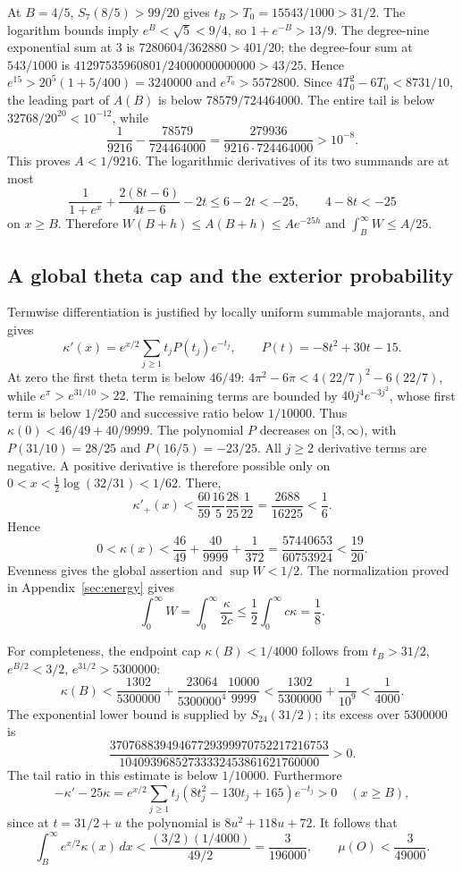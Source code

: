 At $B=4/5$, $S_7(8/5)>99/20$ gives
$t_B>T_0=15543/1000>31/2$.
The logarithm bounds imply $e^B<\sqrt5<9/4$, so $1+e^{-B}>13/9$.
The degree-nine exponential sum at $3$ is
$7280604/362880>401/20$; the degree-four sum at $543/1000$ is
$41297535960801/24000000000000>43/25$.
Hence $e^{15}>20^5(1+5/400)=3240000$ and $e^{T_0}>5572800$.
Since $4T_0^2-6T_0<8731/10$, the leading part of $A(B)$ is below
$78579/724464000$.
The entire tail is below $32768/20^{20}<10^{-12}$, while
\[
 \frac1{9216}-\frac{78579}{724464000}
 =\frac{279936}{9216\cdot724464000}>10^{-8}.
\]
This proves $A<1/9216$.
The logarithmic derivatives of its two summands are at most
\[
 \frac1{1+e^x}+\frac{2(8t-6)}{4t-6}-2t\le6-2t<-25,
 \qquad 4-8t<-25
\]
on $x\ge B$.
Therefore $W(B+h)\le A(B+h)\le Ae^{-25h}$ and
$\int_B^\infty W\le A/25$.

\subsection{A global theta cap and the exterior probability}
Termwise differentiation is justified by locally uniform summable majorants, and gives
\[
 \kappa'(x)=e^{x/2}\sum_{j\ge1}t_jP(t_j)e^{-t_j},
 \qquad P(t)=-8t^2+30t-15.
\]
At zero the first theta term is below $46/49$:
$4\pi^2-6\pi<4(22/7)^2-6(22/7)$, while
$e^\pi>e^{31/10}>22$.
The remaining terms are bounded by $40j^4e^{-3j^2}$,
whose first term is below $1/250$ and successive ratio below $1/10000$.
Thus $\kappa(0)<46/49+40/9999$.
The polynomial $P$ decreases on $[3,\infty)$, with
$P(31/10)=28/25$ and $P(16/5)=-23/25$.
All $j\ge2$ derivative terms are negative.
A positive derivative is therefore possible only on
$0<x<\frac12\log(32/31)<1/62$.
There,
\[
 \kappa'_+(x)<\frac{60}{59}\frac{16}{5}\frac{28}{25}\frac1{22}
 =\frac{2688}{16225}<\frac16.
\]
Hence
\[
 0<\kappa(x)<\frac{46}{49}+\frac{40}{9999}+\frac1{372}
 =\frac{57440653}{60753924}<\frac{19}{20}.
\]
Evenness gives the global assertion and $\sup W<1/2$.
The normalization proved in Appendix~\ref{sec:energy} gives
\[
 \int_0^\infty W
 =\int_0^\infty\frac{\kappa}{2c}\le\frac12\int_0^\infty c\kappa=\frac18.
\]

For completeness, the endpoint cap $\kappa(B)<1/4000$ follows from
$t_B>31/2$, $e^{B/2}<3/2$, $e^{31/2}>5300000$:
\[
 \kappa(B)<\frac{1302}{5300000}
 +\frac{23064}{5300000^4}\frac{10000}{9999}
 <\frac{1302}{5300000}+\frac1{10^9}<\frac1{4000}.
\]
The exponential lower bound is supplied by $S_{24}(31/2)$;
its excess over $5300000$ is
\[
 \frac{37076883949467729399970752217216753}
 {10409396852733332453861621760000}>0.
\]
The tail ratio in this estimate is below $1/10000$.
Furthermore
\[
 -\kappa'-25\kappa
 =e^{x/2}\sum_{j\ge1}t_j(8t_j^2-130t_j+165)e^{-t_j}>0
 \quad(x\ge B),
\]
since at $t=31/2+u$ the polynomial is $8u^2+118u+72$.
It follows that
\[
 \int_B^\infty e^{x/2}\kappa(x)\,dx
 <\frac{(3/2)(1/4000)}{49/2}=\frac3{196000},
 \qquad \mu(O)<\frac3{49000}.
\]

